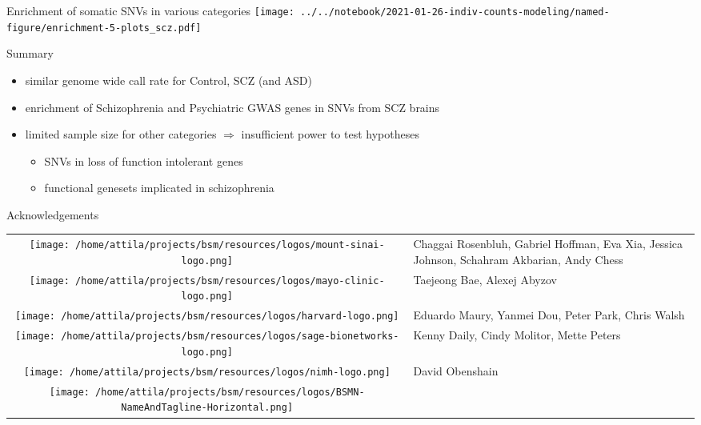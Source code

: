 \documentclass[usenames,dvipsnames]{beamer}
\begin{document}
\begin{frame}{Enrichment of somatic SNVs in various categories}
\texttt{[image: ../../notebook/2021-01-26-indiv-counts-modeling/named-figure/enrichment-5-plots\_scz.pdf]}
\end{frame}

\begin{frame}{Summary}
\begin{itemize}
\item similar genome wide call rate for Control, SCZ (and ASD)
\item enrichment of Schizophrenia and Psychiatric GWAS genes in SNVs from
	SCZ brains
\item limited sample size for other categories \(\Rightarrow\) insufficient power to test
	hypotheses
\begin{itemize}
	\item SNVs in loss of function intolerant genes
        \item functional genesets implicated in schizophrenia
\end{itemize}
\end{itemize}
\end{frame}

\begin{frame}{Acknowledgements}
\footnotesize
\begin{tabular}{cp{3in}}
\parbox[c]{9em}{\texttt{[image: /home/attila/projects/bsm/resources/logos/mount-sinai-logo.png]}}
& Chaggai Rosenbluh, Gabriel Hoffman, Eva Xia, Jessica Johnson, Schahram Akbarian, Andy Chess \\
\noalign{\medskip}
\parbox[c]{9em}{\texttt{[image: /home/attila/projects/bsm/resources/logos/mayo-clinic-logo.png]}} & Taejeong Bae, Alexej Abyzov \\
\noalign{\medskip}
\parbox[c]{9em}{\texttt{[image: /home/attila/projects/bsm/resources/logos/harvard-logo.png]}}
& Eduardo Maury, Yanmei Dou, Peter Park, Chris Walsh \\
\noalign{\medskip}
\parbox[c]{9em}{\texttt{[image: /home/attila/projects/bsm/resources/logos/sage-bionetworks-logo.png]}} & Kenny Daily, Cindy Molitor, Mette Peters \\
\noalign{\medskip}
\parbox[c]{9em}{\texttt{[image: /home/attila/projects/bsm/resources/logos/nimh-logo.png]}}
& David Obenshain \\
\noalign{\medskip}
\parbox[c]{9em}{\texttt{[image: /home/attila/projects/bsm/resources/logos/BSMN-NameAndTagline-Horizontal.png]}}
& \\
\end{tabular}
\end{frame}
\end{document}

